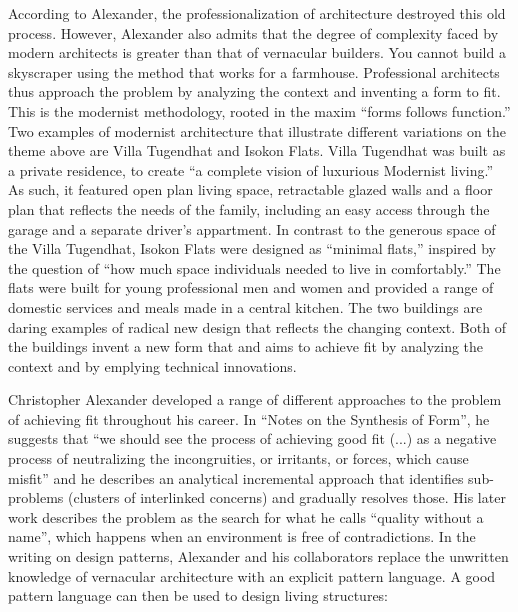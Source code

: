 According to Alexander, the professionalization of architecture destroyed this old process.
However, Alexander also admits that the degree of complexity faced by modern architects is
greater than that of vernacular builders. You cannot build a skyscraper using the method that
works for a farmhouse. Professional architects thus approach the problem by analyzing the context
and inventing a form to fit. This is the modernist methodology, rooted in the maxim ``forms follows
function.''
Two examples of modernist architecture that illustrate different
variations on the theme above are Villa Tugendhat and Isokon Flats. Villa Tugendhat was built as
a private residence, to create ``a complete vision of luxurious Modernist
living.''
As such, it featured open plan living space, retractable glazed walls and a floor plan that
reflects the needs of the family, including an easy access through the garage and a separate
driver's appartment. In contrast to the generous space of the Villa Tugendhat, Isokon Flats were
designed as ``minimal flats,'' inspired by the question of ``how much space
individuals needed to live in comfortably.''
The flats were built for young professional men and women and provided a range of domestic services
and meals made in a central kitchen. The two buildings are daring examples of radical new design
that reflects the changing context. Both of the buildings invent a new form that and aims to
achieve fit by analyzing the context and by emplying technical innovations.

Christopher Alexander developed a range of different approaches to the problem of achieving
fit throughout his career. In ``Notes on the Synthesis of Form'', he suggests that
``we should see the process of achieving good fit (...) as a negative process of neutralizing
the incongruities, or irritants, or forces, which cause misfit'' and
he describes an analytical incremental approach that identifies sub-problems (clusters of
interlinked concerns) and gradually resolves those. His later work describes the problem as the
search for what he calls ``quality without a name'', which happens when an environment is
free of contradictions. In the writing on design patterns, Alexander and his collaborators
replace the unwritten knowledge of vernacular architecture with an explicit pattern language.
A good pattern language can then be used to design living structures:


